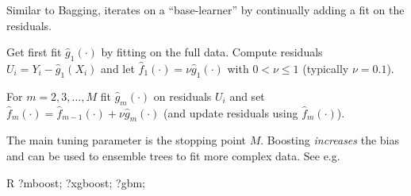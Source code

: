 \begin{sectionbox}[$L_{2}$Boosting]\nospacing{}
  Similar to Bagging, iterates on a ``base-learner'' by continually adding a fit on the residuals.
  \begin{enumeratenosep}[label=\roman*]
    \item Get first fit $\hat{g}_{1}(\cdot)$ by fitting on the full data. Compute residuals $U_{i} = Y_{i} - \hat{g}_{1}(X_{i})$ and let $\hat{f}_{1}(\cdot) = \nu \hat{g}_{1}(\cdot)$ with $0 < \nu \leq 1$ (typically $\nu = 0.1$).
    \item For $m = 2, 3, \dots, M$ fit $\hat{g}_{m}(\cdot)$ on residuals $U_{i}$ and set $\hat{f}_{m}(\cdot) = \hat{f}_{m-1}(\cdot) + \nu \hat{g}_{m}(\cdot)$ (and update residuals using $\hat{f}_{m}(\cdot)$).
  \end{enumeratenosep}
  The main tuning parameter is the stopping point $M$. Boosting \emph{increases} the bias and can be used to ensemble trees to fit more complex data. See e.g.
  \begin{mintlinebox}{R}
      ?mboost; ?xgboost; ?gbm;
  \end{mintlinebox}
\end{sectionbox}
